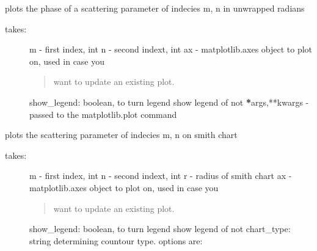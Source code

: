 \documentclass[letterpaper,10pt,english]{sphinxmanual}
\begin{document}
\begin{fulllineitems}
\begin{fulllineitems}
\begin{description}
\end{description}

\end{fulllineitems}


\begin{fulllineitems}
\label{api/mwavepy:mwavepy.network.Network.plot_s_rad_unwrapped}
plots the phase of a scattering parameter of indecies m, n in
unwrapped radians
\begin{description}
\item[{takes:}] \leavevmode
m - first index, int
n - second indext, int
ax - matplotlib.axes object to plot on, used in case you
\begin{quote}

want to update an existing plot.
\end{quote}

show\_legend: boolean, to turn legend show legend of not
{\color{red}\bfseries{}*}args,**kwargs - passed to the matplotlib.plot command

\end{description}

\end{fulllineitems}


\begin{fulllineitems}
\label{api/mwavepy:mwavepy.network.Network.plot_s_smith}
plots the scattering parameter of indecies m, n on smith chart
\begin{description}
\item[{takes:}] \leavevmode
m - first index, int
n - second indext, int
r -  radius of smith chart
ax - matplotlib.axes object to plot on, used in case you
\begin{quote}

want to update an existing plot.
\end{quote}

show\_legend: boolean, to turn legend show legend of not
chart\_type: string determining countour type. options are:
\begin{quote}


\end{quote}
\end{description}
\end{fulllineitems}
\end{fulllineitems}
\end{document}
